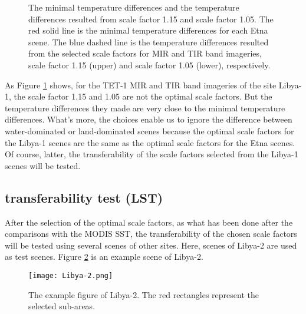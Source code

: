 \begin{figure}[!htbp]
\centering
{}
\hspace{0.5in}
\caption{The minimal temperature differences and the temperature differences resulted from scale factor 1.15 and scale factor 1.05. The red solid line is the minimal temperature differences for each Etna scene. The blue dashed line is the temperature differences resulted from the selected scale factors for MIR and TIR band imageries, scale factor 1.15 (upper) and scale factor 1.05 (lower), respectively.}
\label{fig:Lybia-1_bsc&temCom}
\end{figure}

\noindent As Figure \ref{fig:Lybia-1_bsc&temCom} shows, for the TET-1 MIR and TIR band imageries of the site Libya-1, the scale factor 1.15 and 1.05 are not the optimal scale factors. But the temperature differences they made are very close to the minimal temperature differences. What's more, the choices enable us to ignore the difference between water-dominated or land-dominated scenes because the optimal scale factors for the Libya-1 scenes are the same as the optimal scale factors for the Etna scenes. Of course, latter, the transferability of the scale factors selected from the Libya-1 scenes will be tested.\\


\subsection{transferability test (LST)}
After the selection of the optimal scale factors, as what has been done after the comparisons with the MODIS SST, the transferability of  the chosen scale factors will be tested using several scenes of other sites. Here, scenes of Libya-2 are used as test scenes. Figure \ref{fig:Libya2_sub_areas} is an example scene of Libya-2.\\

\begin{figure}[!htbp]
\centering
\texttt{[image: Libya-2.png]}
\caption{The example figure of Libya-2. The red rectangles represent the selected sub-areas.}
\label{fig:Libya2_sub_areas}
\end{figure}

